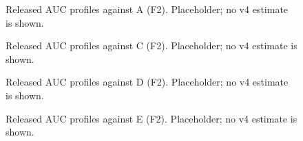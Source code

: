 \begin{figure}[t]
\centering{}
\caption{Released AUC profiles against A (F2). Placeholder; no v4 estimate is shown.}\label{fig:v4-F2A}
\end{figure}
\begin{figure}[t]
\centering{}
\caption{Released AUC profiles against C (F2). Placeholder; no v4 estimate is shown.}\label{fig:v4-F2C}
\end{figure}
\begin{figure}[t]
\centering{}
\caption{Released AUC profiles against D (F2). Placeholder; no v4 estimate is shown.}\label{fig:v4-F2D}
\end{figure}
\begin{figure}[t]
\centering{}
\caption{Released AUC profiles against E (F2). Placeholder; no v4 estimate is shown.}\label{fig:v4-F2E}
\end{figure}
